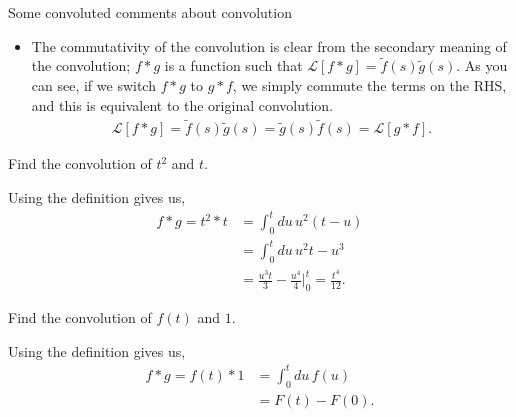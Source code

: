 \documentclass[11pt]{article}
\newtheorem*{solution}{Solution}
\theoremstyle{mystyle}
\begin{document}
\begin{psremark}{Some convoluted comments about convolution}{}
\begin{itemize}
\begin{solution}
\begin{align*}
        \end{align*}
        We want to make this double integral look something like a Laplace transform,
        so let's make a change of variables, $t = u + v$. Subbing this in gives us,
        \begin{align*}
            \int_0^\infty dv \int_0^\infty du \, f(u)g(v)e^{-s(u + v)}
            & = \int_0^\infty dt \underbrace{\int_0^t du \, f(u)g(t - u)}_{h(t)} e^{-st}.
        \end{align*}
        As you can see, if we define $h(t) \equiv \int_0^t du \, f(u) g(t - u)$,
        we get our desired result: $\mathcal{L}[h(t)] = \tilde{f}(s)\tilde{g}(s)$.
        Very cool.
        \end{solution}
        \item The commutativity of the convolution is clear
        from the secondary meaning of the convolution; $f * g$
        is a function such that $\mathcal{L}[f * g] = \tilde{f}(s)\tilde{g}(s)$.
        As you can see, if we switch $f * g$ to $g * f$, 
        we simply commute the terms on the RHS, and this 
        is equivalent to the original convolution.
        \begin{align*}
            \mathcal{L}[f * g] = \tilde{f}(s)\tilde{g}(s) = \tilde{g}(s)\tilde{f}(s) = \mathcal{L}[g * f].
        \end{align*}
    \end{itemize}
\end{psremark}

\begin{psexample}{}{}
        Find the convolution of $t^2$ and $t$.
\end{psexample}
    \begin{pssolution}{}{}
        Using the definition gives us,
        \begin{align*}
            f * g = t^2 * t & = \int_0^t du \, u^2 (t - u)\\
            & = \int_0^t du \, u^2t - u^3\\
            & = \frac{u^3 t}{3} - \frac{u^4}{4} \Bigg|_0^t = \frac{t^4}{12}.
        \end{align*}
    \end{pssolution}
    \begin{psexample}{}{}
        Find the convolution of $f(t)$ and $1$.
    \end{psexample}
    \begin{pssolution}{}{}
        Using the definition gives us,
        \begin{align*}
            f * g = f(t) * 1 & = \int_0^t du \, f(u)\\
            & = F(t) - F(0).
        \end{align*}
    \end{pssolution}
\end{document}
